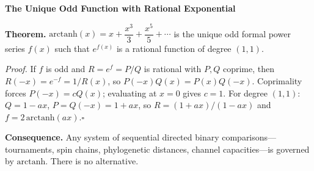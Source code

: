 \documentclass[12pt]{article}
\begin{document}
\begin{center}
{\Large\bfseries The Unique Odd Function with Rational Exponential}
\end{center}

\medskip

\textbf{Theorem.} $\mathrm{arctanh}(x) = x + \dfrac{x^3}{3} + \dfrac{x^5}{5} + \cdots$ is the unique odd formal power series $f(x)$ such that $e^{f(x)}$ is a rational function of degree $(1,1)$.

\medskip

\textit{Proof.} If $f$ is odd and $R = e^f = P/Q$ is rational with $P,Q$ coprime, then $R(-x) = e^{-f} = 1/R(x)$, so $P(-x)Q(x) = P(x)Q(-x)$. Coprimality forces $P(-x) = cQ(x)$; evaluating at $x = 0$ gives $c = 1$. For degree $(1,1)$: $Q = 1 - ax$, $P = Q(-x) = 1 + ax$, so $R = (1+ax)/(1-ax)$ and $f = 2\,\mathrm{arctanh}(ax)$.\hfill$\square$

\medskip

\textbf{Consequence.} Any system of sequential directed binary comparisons---tournaments, spin chains, phylogenetic distances, channel capacities---is governed by $\mathrm{arctanh}$. There is no alternative.
\end{document}

